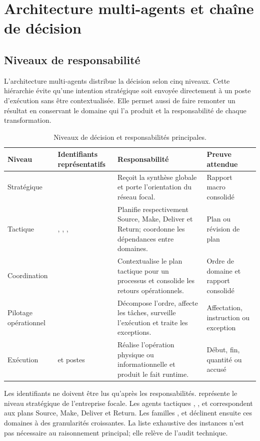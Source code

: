 \chapter{Architecture multi-agents et chaîne de décision}
\label{chap:architecture-agents}

\section{Niveaux de responsabilité}

L'architecture multi-agents distribue la décision selon cinq niveaux. Cette hiérarchie évite qu'une intention stratégique soit envoyée directement à un poste d'exécution sans être contextualisée. Elle permet aussi de faire remonter un résultat en conservant le domaine qui l'a produit et la responsabilité de chaque transformation.

\begin{table}[H]
  \centering
  \caption{Niveaux de décision et responsabilités principales.}
  \label{tab:niveaux-agents}
  \begin{tabularx}{\textwidth}{@{}L{0.19\textwidth}L{0.27\textwidth}Y L{0.20\textwidth}@{}}
    \toprule
    Niveau & Identifiants représentatifs & Responsabilité & Preuve attendue \\
    \midrule
    Stratégique &  & Reçoit la synthèse globale et porte l'orientation du réseau focal. & Rapport macro consolidé \\
    Tactique & , , ,  & Planifie respectivement Source, Make, Deliver et Return; coordonne les dépendances entre domaines. & Plan ou révision de plan \\
    Coordination &  & Contextualise le plan tactique pour un processus et consolide les retours opérationnels. & Ordre de domaine et rapport consolidé \\
    Pilotage opérationnel &  & Décompose l'ordre, affecte les tâches, surveille l'exécution et traite les exceptions. & Affectation, instruction ou exception \\
    Exécution &  et postes & Réalise l'opération physique ou informationnelle et produit le fait runtime. & Début, fin, quantité ou accusé \\
    \bottomrule
  \end{tabularx}
\end{table}

Les identifiants ne doivent être lus qu'après les responsabilités.  représente le niveau stratégique de l'entreprise focale. Les agents tactiques , ,  et  correspondent aux plans Source, Make, Deliver et Return. Les familles ,  et  déclinent ensuite ces domaines à des granularités croissantes. La liste exhaustive des instances n'est pas nécessaire au raisonnement principal; elle relève de l'audit technique.

